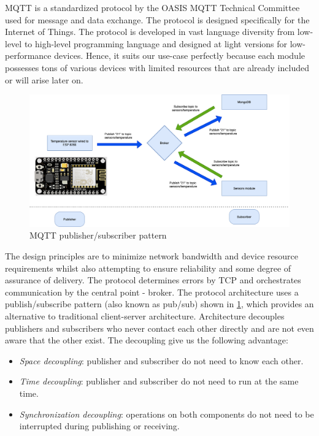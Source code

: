 MQTT is a standardized protocol by the OASIS MQTT Technical Committee used for message and data exchange. The protocol is designed specifically for the Internet of Things. The protocol is developed in vast language diversity from low-level to high-level programming language and designed at light versions for low-performance devices. Hence, it suits our use-case perfectly because each module possesses tons of various devices with limited resources that are already included or will arise later on. \citep{mqtt_malý_2016}

\begin{figure}[H]
	\centering
	\includegraphics[width=\textwidth]{img/MQTT_pub_sub_pattern.png}
	\caption{MQTT publisher/subscriber pattern}
	\label{fig:MQTT_pub_sub_pattern}
  \end{figure}

The design principles are to minimize network bandwidth and device resource requirements whilst also attempting to ensure reliability and some degree of assurance of delivery. The protocol determines errors by TCP and orchestrates communication by the central point - broker. The protocol architecture uses a publish/subscribe pattern (also known as pub/sub) shown in \cref{fig:MQTT_pub_sub_pattern}, which provides an alternative to traditional client-server architecture. Architecture decouples publishers and subscribers who never contact each other directly and are not even aware that the other exist. The decoupling give us the following advantage:

\begin{itemize}
	\item \textit{Space decoupling}: publisher and subscriber do not need to know each other.
	\item \textit{Time decoupling}: publisher and subscriber do not need to run at the same time.
	\item \textit{Synchronization decoupling}: operations on both components do not need to be interrupted during publishing or receiving.
\end{itemize}

